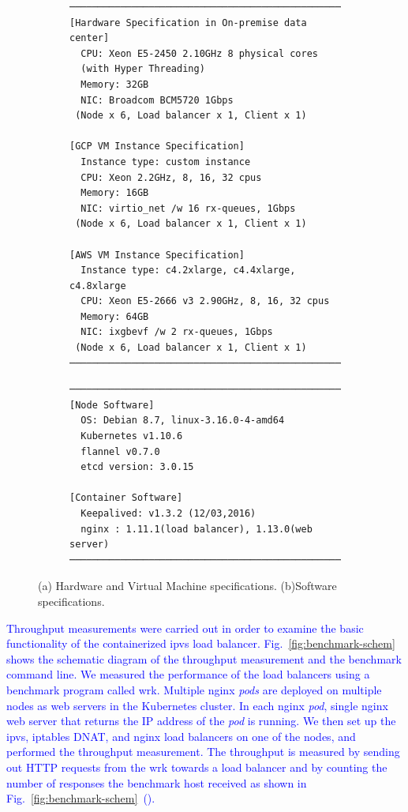 \begin{figure}[tb]

  \begin{subfigure}[t]{\columnwidth}
\begin{Verbatim}[commandchars=\\\{\}]
───────────────────────────────────────────────────────
[Hardware Specification in On-premise data center]
  CPU: Xeon E5-2450 2.10GHz 8 physical cores
  (with Hyper Threading) 
  Memory: 32GB
  NIC: Broadcom BCM5720 1Gbps
 (Node x 6, Load balancer x 1, Client x 1)

[GCP VM Instance Specification]
  Instance type: custom instance
  CPU: Xeon 2.2GHz, 8, 16, 32 cpus
  Memory: 16GB
  NIC: virtio_net /w 16 rx-queues, 1Gbps
 (Node x 6, Load balancer x 1, Client x 1)

[AWS VM Instance Specification]
  Instance type: c4.2xlarge, c4.4xlarge, c4.8xlarge 
  CPU: Xeon E5-2666 v3 2.90GHz, 8, 16, 32 cpus
  Memory: 64GB
  NIC: ixgbevf /w 2 rx-queues, 1Gbps
 (Node x 6, Load balancer x 1, Client x 1)
───────────────────────────────────────────────────────
\end{Verbatim}
    \caption{}
    \label{fig:machine_spec}
  \end{subfigure}

  \begin{subfigure}[t]{\columnwidth}
\begin{Verbatim}[commandchars=\\\{\}]
───────────────────────────────────────────────────────
[Node Software]
  OS: Debian 8.7, linux-3.16.0-4-amd64
  Kubernetes v1.10.6
  flannel v0.7.0
  etcd version: 3.0.15

[Container Software]
  Keepalived: v1.3.2 (12/03,2016)
  nginx : 1.11.1(load balancer), 1.13.0(web server) 
───────────────────────────────────────────────────────
\end{Verbatim}
    \caption{}
    \label{fig:software_spec}
  \end{subfigure}

  \caption{
    (a) Hardware and Virtual Machine specifications. (b)Software specifications.
  }
  \label{fig:benchmark-spec}
\end{figure}

\textcolor{blue}{
Throughput measurements were carried out in order to examine the basic functionality of the containerized ipvs load balancer.
Fig.~\ref{fig:benchmark-schem} shows the schematic diagram of the throughput measurement and the benchmark command line.
We measured the performance of the load balancers using a benchmark program called wrk\cite{Glozer2016}.
Multiple nginx {\em pods} are deployed on multiple nodes as web servers in the Kubernetes cluster.
In each nginx {\em pod}, single nginx web server that returns the IP address of the {\em pod} is running.
We then set up the ipvs, iptables DNAT, and nginx load balancers on one of the nodes, and performed the throughput measurement.
The throughput is measured by sending out HTTP requests from the wrk towards a load balancer and by counting the number of responses the benchmark host received as shown in Fig.~\ref{fig:benchmark-schem}~().
}

